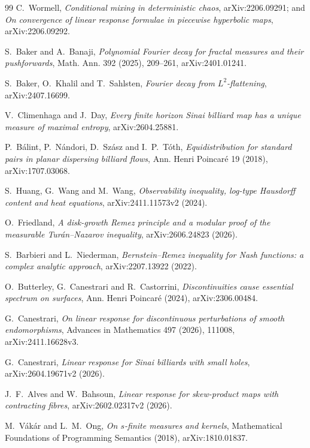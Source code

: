 \documentclass[11pt]{article}
\begin{document}
\begin{thebibliography}{99}
C.~Wormell,
\emph{Conditional mixing in deterministic chaos},
arXiv:2206.09291; and
\emph{On convergence of linear response formulae in piecewise hyperbolic maps},
arXiv:2206.09292.

S.~Baker and A.~Banaji,
\emph{Polynomial Fourier decay for fractal measures and their pushforwards},
Math. Ann. 392 (2025), 209--261, arXiv:2401.01241.

S.~Baker, O.~Khalil and T.~Sahlsten,
\emph{Fourier decay from $L^2$-flattening},
arXiv:2407.16699.

V.~Climenhaga and J.~Day,
\emph{Every finite horizon Sinai billiard map has a unique measure of maximal entropy},
arXiv:2604.25881.

P.~B\'alint, P.~N\'andori, D.~Sz\'asz and I.~P.~T\'oth,
\emph{Equidistribution for standard pairs in planar dispersing billiard flows},
Ann. Henri Poincar\'e 19 (2018), arXiv:1707.03068.

S.~Huang, G.~Wang and M.~Wang,
\emph{Observability inequality, log-type Hausdorff content and heat equations},
arXiv:2411.11573v2 (2024).

O.~Friedland,
\emph{A disk-growth Remez principle and a modular proof of the measurable
Tur\'an--Nazarov inequality}, arXiv:2606.24823 (2026).

S.~Barbieri and L.~Niederman,
\emph{Bernstein--Remez inequality for Nash functions: a complex analytic
approach}, arXiv:2207.13922 (2022).

O.~Butterley, G.~Canestrari and R.~Castorrini,
\emph{Discontinuities cause essential spectrum on surfaces},
Ann. Henri Poincar\'e (2024), arXiv:2306.00484.

G.~Canestrari,
\emph{On linear response for discontinuous perturbations of smooth
endomorphisms}, Advances in Mathematics 497 (2026), 111008,
arXiv:2411.16628v3.

G.~Canestrari,
\emph{Linear response for Sinai billiards with small holes},
arXiv:2604.19671v2 (2026).

J.~F.~Alves and W.~Bahsoun,
\emph{Linear response for skew-product maps with contracting fibres},
arXiv:2602.02317v2 (2026).

M.~V\'ak\'ar and L.~M.~Ong,
\emph{On $s$-finite measures and kernels},
Mathematical Foundations of Programming Semantics (2018),
arXiv:1810.01837.


\end{thebibliography}
\end{document}
